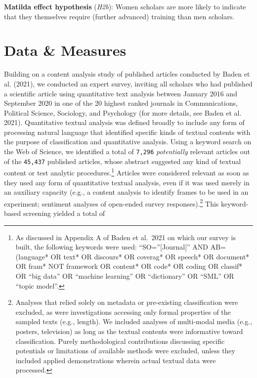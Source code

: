 \documentclass[
]{ccr}
\begin{document}
\textbf{Matilda effect hypothesis} (\emph{H2b}): Women scholars are more
likely to indicate that they themselves require (further advanced)
training than men scholars.

\hypertarget{data-measures}{%
\section{Data \& Measures}\label{data-measures}}

Building on a content analysis study of published articles conducted by
Baden et al. (2021), we conducted an expert survey, inviting all
scholars who had published a scientific article using quantitative text
analysis between January 2016 and September 2020 in one of the 20
highest ranked journals in Communications, Political Science, Sociology,
and Psychology (for more details, see Baden et al. 2021). Quantitative
textual analysis was defined broadly to include any form of processing
natural language that identified specific kinds of textual contents with
the purpose of classification and quantitative analysis. Using a keyword
search on the Web of Science, we identified a total of \texttt{7,296}
\emph{potentially} relevant articles out of the \texttt{45,437}
published articles, whose abstract suggested any kind of textual content
or test analytic procedures.\footnote{As discussed in Appendix A of
  Baden et al.~2021 on which our survey is built, the following keywords
  were used: ``SO=''{[}Journal{]}'' AND AB=(language* OR text* OR
  discours* OR coverag* OR speech* OR document* OR fram* NOT framework
  OR content* OR code* OR coding OR classif* OR ``big data'' OR
  ``machine learning'' OR ``dictionary'' OR ``SML'' OR ``topic model''.}
Articles were considered relevant as soon as they used any form of
quantitative textual analysis, even if it was used merely in an
auxiliary capacity (e.g., a content analysis to identify frames to be
used in an experiment; sentiment analyses of open-ended survey
responses).\footnote{Analyses that relied solely on metadata or
  pre-existing classification were excluded, as were investigations
  accessing only formal properties of the sampled texts (e.g., length).
  We included analyses of multi-modal media (e.g., posters, television)
  as long as the textual contents were informative toward
  classification. Purely methodological contributions discussing
  specific potentials or limitations of available methods were excluded,
  unless they included applied demonstrations wherein actual textual
  data were processed.} This keyword-based screening yielded a total of
\end{document}
